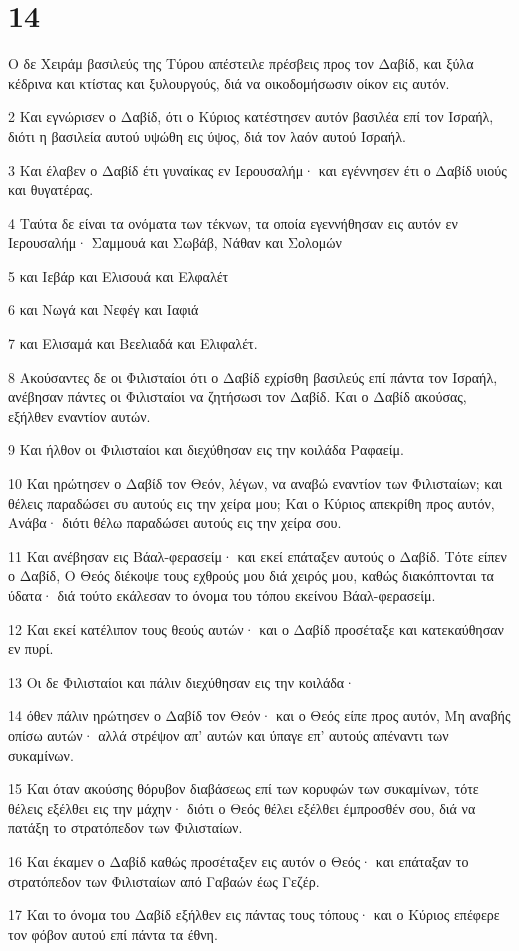 \chapter{14}

\par Ο δε Χειράμ βασιλεύς της Τύρου απέστειλε πρέσβεις προς τον Δαβίδ, και ξύλα κέδρινα και κτίστας και ξυλουργούς, διά να οικοδομήσωσιν οίκον εις αυτόν.
\par 2 Και εγνώρισεν ο Δαβίδ, ότι ο Κύριος κατέστησεν αυτόν βασιλέα επί τον Ισραήλ, διότι η βασιλεία αυτού υψώθη εις ύψος, διά τον λαόν αυτού Ισραήλ.
\par 3 Και έλαβεν ο Δαβίδ έτι γυναίκας εν Ιερουσαλήμ· και εγέννησεν έτι ο Δαβίδ υιούς και θυγατέρας.
\par 4 Ταύτα δε είναι τα ονόματα των τέκνων, τα οποία εγεννήθησαν εις αυτόν εν Ιερουσαλήμ· Σαμμουά και Σωβάβ, Νάθαν και Σολομών
\par 5 και Ιεβάρ και Ελισουά και Ελφαλέτ
\par 6 και Νωγά και Νεφέγ και Ιαφιά
\par 7 και Ελισαμά και Βεελιαδά και Ελιφαλέτ.
\par 8 Ακούσαντες δε οι Φιλισταίοι ότι ο Δαβίδ εχρίσθη βασιλεύς επί πάντα τον Ισραήλ, ανέβησαν πάντες οι Φιλισταίοι να ζητήσωσι τον Δαβίδ. Και ο Δαβίδ ακούσας, εξήλθεν εναντίον αυτών.
\par 9 Και ήλθον οι Φιλισταίοι και διεχύθησαν εις την κοιλάδα Ραφαείμ.
\par 10 Και ηρώτησεν ο Δαβίδ τον Θεόν, λέγων, να αναβώ εναντίον των Φιλισταίων; και θέλεις παραδώσει συ αυτούς εις την χείρα μου; Και ο Κύριος απεκρίθη προς αυτόν, Ανάβα· διότι θέλω παραδώσει αυτούς εις την χείρα σου.
\par 11 Και ανέβησαν εις Βάαλ-φερασείμ· και εκεί επάταξεν αυτούς ο Δαβίδ. Τότε είπεν ο Δαβίδ, Ο Θεός διέκοψε τους εχθρούς μου διά χειρός μου, καθώς διακόπτονται τα ύδατα· διά τούτο εκάλεσαν το όνομα του τόπου εκείνου Βάαλ-φερασείμ.
\par 12 Και εκεί κατέλιπον τους θεούς αυτών· και ο Δαβίδ προσέταξε και κατεκαύθησαν εν πυρί.
\par 13 Οι δε Φιλισταίοι και πάλιν διεχύθησαν εις την κοιλάδα·
\par 14 όθεν πάλιν ηρώτησεν ο Δαβίδ τον Θεόν· και ο Θεός είπε προς αυτόν, Μη αναβής οπίσω αυτών· αλλά στρέψον απ' αυτών και ύπαγε επ' αυτούς απέναντι των συκαμίνων.
\par 15 Και όταν ακούσης θόρυβον διαβάσεως επί των κορυφών των συκαμίνων, τότε θέλεις εξέλθει εις την μάχην· διότι ο Θεός θέλει εξέλθει έμπροσθέν σου, διά να πατάξη το στρατόπεδον των Φιλισταίων.
\par 16 Και έκαμεν ο Δαβίδ καθώς προσέταξεν εις αυτόν ο Θεός· και επάταξαν το στρατόπεδον των Φιλισταίων από Γαβαών έως Γεζέρ.
\par 17 Και το όνομα του Δαβίδ εξήλθεν εις πάντας τους τόπους· και ο Κύριος επέφερε τον φόβον αυτού επί πάντα τα έθνη.

